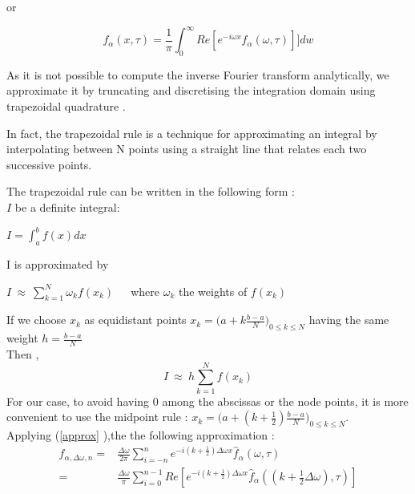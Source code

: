 \documentclass[12pt]{report}
\begin{document}
or 

\begin{equation}
f_{\alpha}(x,\tau)=\frac{1}{\pi}\int_{0}^{\infty} Re[e^{-i \omega x}\hat{f}_{\alpha}(\omega,\tau)] ]dw
\end{equation}


As it is not possible to compute the inverse Fourier transform analytically, we
approximate it by truncating and discretising the integration domain using trapezoidal
quadrature . 

In fact, the trapezoidal rule is a technique for approximating an integral by interpolating between N  points using a straight line that relates each two successive points. 

The trapezoidal rule can be written in the following form :\\
  
 $I$ be a definite integral:
\begin{center}
$I=\int_{a}^{b} f(x) dx$
\end{center}  
I is approximated by 
\begin{center}
$I ~\approx ~ \sum \limits_{k=1}^{N} \omega_k f(x_k)$~~~where $\omega_k$  the weights of $f(x_k)$ 
\end{center}
If we choose $x_k$ as equidistant points $x_k= \big ( a+k \frac{b-a}{N}\big ) _{0 \le k \le N}$ having the same weight $h=\frac{b-a}{N}$\\
Then ,\\
\begin{equation}
I ~\approx ~ h \sum \limits_{k=1}^{N} f(x_k)
\label{approx}
\end{equation}
For our case, to avoid having 0 among the abscissas  or the node points, it is more convenient to use the midpoint rule :
 $ x_k= \big ( a+(k+\frac{1}{2}) \frac{b-a}{N}\big ) _{0 \le k \le N}$.\\

Applying (\ref{approx} ),the the following approximation :
\begin{align}
f_{\alpha,\Delta \omega, n}=&\frac{\Delta \omega}{2\pi} \sum \limits_{i=-n}^n e^{-i(k+\frac{1}{2}) \Delta \omega x }\hat{f}_{\alpha}(\omega,\tau)
\\
=& \frac{\Delta \omega}{\pi} \sum \limits_{i=0}^{n-1} Re[e^{-i(k+\frac{1}{2}) \Delta \omega x }\hat{f}_{\alpha}((k+\frac{1}{2}\Delta\omega ),\tau)]
\label{fret}
\end{align}
\end{document}
